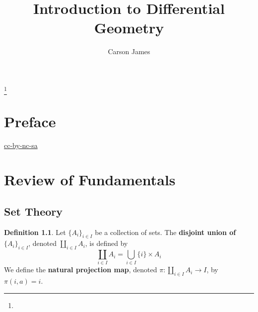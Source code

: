 \documentclass{book}
\theoremstyle{definition}
\newtheorem{defn}[definition]{Definition}
\DeclareMathOperator*{\0}{\mbf{0}}
\DeclareMathOperator*{\1}{\mbf{1}}
\newcommand{\tbf}[1]{\textbf{#1}}
\begin{document}
	
	\frontmatter
	
	\title{Introduction to Differential Geometry}
	
	
	\author{Carson James}
	\thanks{}
	
	\date{}
	
	\maketitle
	
	
\setcounter{page}{4}
	
\tableofcontents
\printunsrtglossary[type=symbols,style=long,title={Notation}]
	
%
	
\mainmatter
%
	
\chapter*{Preface}
	
\begin{flushleft}
	\href{https://creativecommons.org/licenses/by-nc-sa/4.0/legalcode.txt}{cc-by-nc-sa}
\end{flushleft}
	
\newpage
	
	\chapter{Review of Fundamentals}

	\section{Set Theory}
	
	\begin{defn}
		Let $\{A_i\}_{i \in I}$ be a collection of sets. The \tbf{disjoint union of} $\{A_i\}_{i \in I}$, denoted $\coprod\limits_{i \in I} A_i$, is defined by $$\coprod_{i \in I}A_i = \bigcup_{i\in I} \{i\} \times A_i$$ 
		We define the \tbf{natural projection map}, denoted $\pi: \coprod\limits_{i \in I} A_i \rightarrow I$, by $\pi(i, a) = i$.
	\end{defn}
\end{document}
